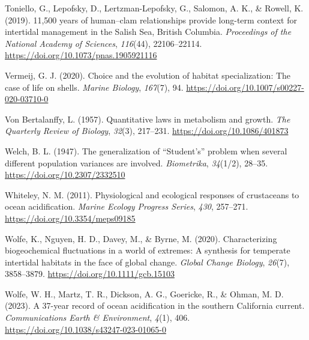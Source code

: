 \documentclass{CSUNthesis}
\begin{document}
Toniello, G., Lepofsky, D., Lertzman-Lepofsky, G., Salomon, A. K., \& Rowell, K. (2019). 11,500 years of human--clam relationships provide long-term context for intertidal management in the Salish Sea, British Columbia. \textit{Proceedings of the National Academy of Sciences}, \textit{116}(44), 22106--22114. \url{https://doi.org/10.1073/pnas.1905921116}

\vspace{0.1em}

Vermeij, G. J. (2020). Choice and the evolution of habitat specialization: The case of life on shells. \textit{Marine Biology}, \textit{167}(7), 94. \url{https://doi.org/10.1007/s00227-020-03710-0}

\vspace{0.1em}

Von Bertalanffy, L. (1957). Quantitative laws in metabolism and growth. \textit{The Quarterly Review of Biology}, \textit{32}(3), 217--231. \url{https://doi.org/10.1086/401873}

\vspace{0.1em}

Welch, B. L. (1947). The generalization of ``Student's'' problem when several different population variances are involved. \textit{Biometrika}, \textit{34}(1/2), 28--35. \url{https://doi.org/10.2307/2332510}

\vspace{0.1em}

Whiteley, N. M. (2011). Physiological and ecological responses of crustaceans to ocean acidification. \textit{Marine Ecology Progress Series}, \textit{430}, 257--271. \url{https://doi.org/10.3354/meps09185}

\vspace{0.1em}

Wolfe, K., Nguyen, H. D., Davey, M., \& Byrne, M. (2020). Characterizing biogeochemical fluctuations in a world of extremes: A synthesis for temperate intertidal habitats in the face of global change. \textit{Global Change Biology}, \textit{26}(7), 3858--3879. \url{https://doi.org/10.1111/gcb.15103}

\vspace{0.1em}

Wolfe, W. H., Martz, T. R., Dickson, A. G., Goericke, R., \& Ohman, M. D. (2023). A 37-year record of ocean acidification in the southern California current. \textit{Communications Earth \& Environment}, \textit{4}(1), 406. \url{https://doi.org/10.1038/s43247-023-01065-0}

\vspace{0.1em}
\end{document}
